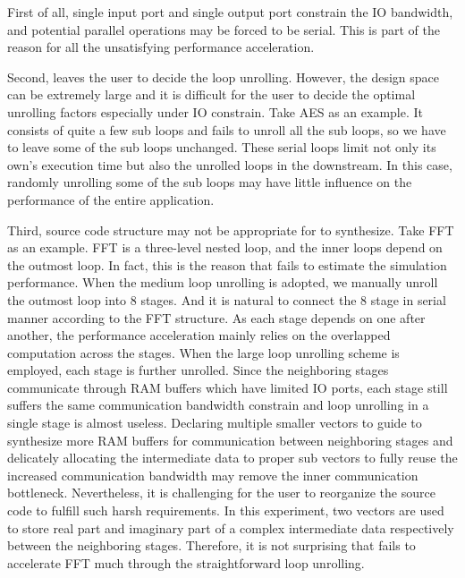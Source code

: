 First of all, single input port and single output port constrain the IO bandwidth, and potential parallel operations may be forced to be serial. This is part of the reason for all the unsatisfying performance acceleration. 

Second, \autoesl leaves the user to decide the loop unrolling. However, the design space can be extremely large and it is difficult for the user to decide the optimal unrolling factors especially under IO constrain. Take AES as an example. It consists of quite a few sub loops and \autoesl fails to unroll all the sub loops, so we have to leave some of the sub loops unchanged. These serial loops limit not only its own's execution time but also the unrolled loops in the downstream. In this case, randomly unrolling some of the sub loops may have little influence on the performance of the entire application. 

Third, source code structure may not be appropriate for \autoesl to synthesize. Take FFT as an example. FFT is a three-level nested loop, and the inner loops depend on the outmost loop. In fact, this is the reason that \autoesl fails to estimate the simulation performance. When the medium loop unrolling is adopted, we manually unroll the outmost loop into 8 stages. And it is natural to connect the 8 stage in serial manner according to the FFT structure. As each stage depends on one after another, the performance acceleration mainly relies on the overlapped computation across the stages. When the large loop unrolling scheme is employed, each stage is further unrolled. Since the neighboring stages communicate through RAM buffers which have limited IO ports, each stage still suffers the same communication bandwidth constrain and loop unrolling in a single stage is almost useless. Declaring multiple smaller vectors to guide \autoesl to synthesize more RAM buffers for communication between neighboring stages and delicately allocating the intermediate data to proper sub vectors to fully reuse the increased communication bandwidth may remove the inner communication bottleneck. Nevertheless, it is challenging for the user to reorganize the source code to fulfill such harsh requirements. In this experiment, two vectors are used to store real part and imaginary part of a complex intermediate data respectively between the neighboring stages. Therefore, it is not surprising that \autoesl fails to accelerate FFT much through the straightforward loop unrolling. 

